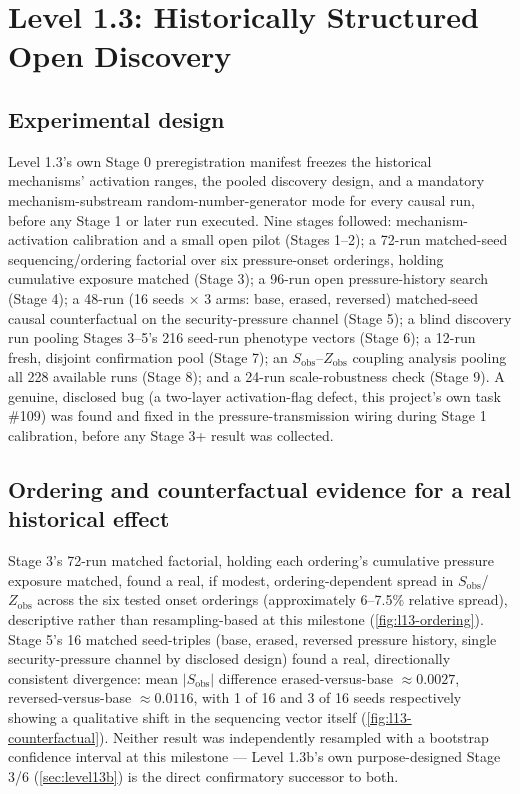 \section{Level 1.3: Historically Structured Open Discovery}
\label{sec:level13}

\subsection{Experimental design}
\label{sec:level13-design}

Level 1.3's own Stage 0 preregistration manifest freezes the historical
mechanisms' activation ranges, the pooled discovery design, and a
mandatory mechanism-substream random-number-generator mode for every
causal run, before any Stage 1 or later run executed. Nine stages
followed: mechanism-activation calibration and a small open pilot
(Stages 1--2); a 72-run matched-seed sequencing/ordering factorial over
six pressure-onset orderings, holding cumulative exposure matched (Stage
3); a 96-run open pressure-history search (Stage 4); a 48-run (16 seeds
$\times$ 3 arms: base, erased, reversed) matched-seed causal counterfactual
on the security-pressure channel (Stage 5); a blind discovery run pooling
Stages 3--5's 216 seed-run phenotype vectors (Stage 6); a 12-run fresh,
disjoint confirmation pool (Stage 7); an $S_{\text{obs}}$--$Z_{\text{obs}}$
coupling analysis pooling all 228 available runs (Stage 8); and a
24-run scale-robustness check (Stage 9). A genuine, disclosed bug (a
two-layer activation-flag defect, this project's own task \#109) was found
and fixed in the pressure-transmission wiring during Stage 1 calibration,
before any Stage 3+ result was collected.

\subsection{Ordering and counterfactual evidence for a real historical effect}
\label{sec:level13-ordering}

Stage 3's 72-run matched factorial, holding each ordering's cumulative
pressure exposure matched, found a real, if modest, ordering-dependent
spread in $S_{\text{obs}}$/$Z_{\text{obs}}$ across the six tested onset
orderings (approximately 6--7.5\% relative spread), descriptive rather
than resampling-based at this milestone (\cref{fig:l13-ordering}). Stage
5's 16 matched seed-triples (base, erased, reversed pressure history,
single security-pressure channel by disclosed design) found a real,
directionally consistent divergence: mean $|S_{\text{obs}}|$ difference
erased-versus-base $\approx0.0027$, reversed-versus-base $\approx0.0116$,
with 1 of 16 and 3 of 16 seeds respectively showing a qualitative shift in
the sequencing vector itself (\cref{fig:l13-counterfactual}). Neither
result was independently resampled with a bootstrap confidence interval at
this milestone --- Level 1.3b's own purpose-designed Stage 3/6
(\cref{sec:level13b}) is the direct confirmatory successor to both.

